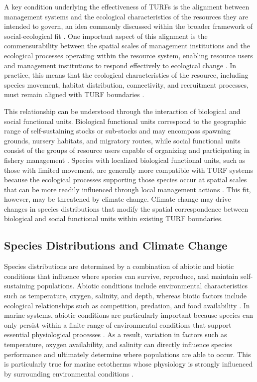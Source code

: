 \documentclass[12pt]{article}
\begin{document}
A key condition underlying the effectiveness of TURFs is the alignment between management systems and the ecological characteristics of the resources they are intended to govern, an idea commonly discussed within the broader framework of social-ecological fit \citep{PoonBonzon2013, AcevesBueno2018, Nenadovic2026}. One important aspect of this alignment is the commensurability between the spatial scales of management institutions and the ecological processes operating within the resource system, enabling resource users and management institutions to respond effectively to ecological change \citep{McCay2017, Nenadovic2026}. In practice, this means that the ecological characteristics of the resource, including species movement, habitat distribution, connectivity, and recruitment processes, must remain aligned with TURF boundaries \citep{McCay2017, PoonBonzon2013, AcevesBueno2018}.

This relationship can be understood through the interaction of biological and social functional units. Biological functional units correspond to the geographic range of self-sustaining stocks or sub-stocks and may encompass spawning grounds, nursery habitats, and migratory routes, while social functional units consist of the groups of resource users capable of organizing and participating in fishery management \citep{PoonBonzon2013}. Species with localized biological functional units, such as those with limited movement, are generally more compatible with TURF systems because the ecological processes supporting those species occur at spatial scales that can be more readily influenced through local management actions \citep{PoonBonzon2013, Nenadovic2026}. This fit, however, may be threatened by climate change. Climate change may drive changes in species distributions that modify the spatial correspondence between biological and social functional units within existing TURF boundaries.

\subsection{Species Distributions and Climate Change}

Species distributions are determined by a combination of abiotic and biotic conditions that influence where species can survive, reproduce, and maintain self-sustaining populations. Abiotic conditions include environmental characteristics such as temperature, oxygen, salinity, and depth, whereas biotic factors include ecological relationships such as competition, predation, and food availability \citep{MeloMerino2020}. In marine systems, abiotic conditions are particularly important because species can only persist within a finite range of environmental conditions that support essential physiological processes \citep{Portner2007}. As a result, variation in factors such as temperature, oxygen availability, and salinity can directly influence species performance and ultimately determine where populations are able to occur. This is particularly true for marine ectotherms whose physiology is strongly influenced by surrounding environmental conditions \citep{Nguyen2011, Portner2007}.
\end{document}
